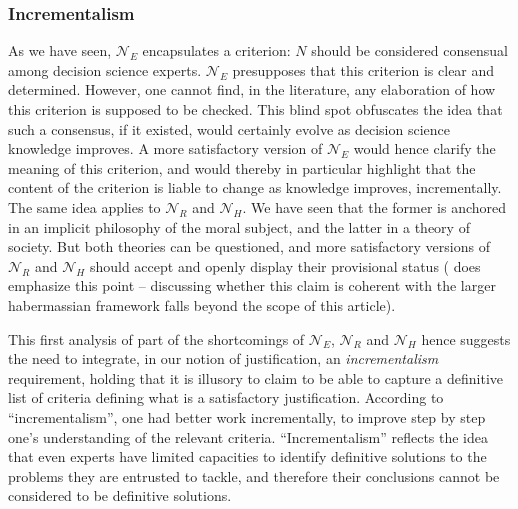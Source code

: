 \documentclass[preprint, french, english, 11pt, authoryear]{elsarticle}%
\begin{document}
\subsubsection{Incrementalism}
As we have seen, $\mathscr{N}_E$ encapsulates a criterion: $N$ should be considered consensual among decision science experts. $\mathscr{N}_E$ presupposes that this criterion is clear and determined. However, one cannot find, in the literature, any elaboration of how this criterion is supposed to be checked. 
This blind spot obfuscates the idea that such a consensus, if it existed, would certainly evolve as decision science knowledge improves. 
A more satisfactory version of $\mathscr{N}_E$ would hence clarify the meaning of this criterion, and would thereby in particular highlight that the content of the criterion is liable to change as knowledge improves, incrementally. The same idea applies to $\mathscr{N}_{R}$ and $\mathscr{N}_{H}$. 
We have seen that the former is anchored in an implicit philosophy of the moral subject, and the latter in a theory of society. 
But both theories can be questioned, and more satisfactory versions of $\mathscr{N}_{R}$ and $\mathscr{N}_{H}$ should accept and openly display their provisional status 
(\cite{habermas_moralbewustsein_1983} does emphasize this point -- discussing whether this claim is coherent with the larger habermassian framework falls beyond the scope of this article).

This first analysis of part of the shortcomings of $\mathscr{N}_E$, $\mathscr{N}_{R}$ and $\mathscr{N}_{H}$ hence suggests the need to integrate, in our notion of justification, an \emph{incrementalism} requirement, 
holding that it is illusory to claim to be able to capture a definitive list of criteria defining what is a satisfactory justification. According to “incrementalism”, one had better work incrementally, to improve step by step one's understanding of the relevant criteria. 
“Incrementalism” reflects the idea that even experts have limited capacities to identify definitive solutions to the problems they are entrusted to tackle, and therefore their conclusions cannot be considered to be definitive solutions.
\end{document}
